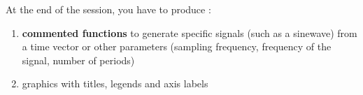 \documentclass[10pt]{article} %
\begin{document}
\begin{minipage}[t]{.60\linewidth}
\begin{mdframed}[style=intextbox,frametitle={}] %


\hypertarget{deliverables}{} %

At the end of the session, you have to produce :
\begin{enumerate}
\item \textbf{commented functions} to generate specific signals (such as a sinewave) from a time vector or other parameters (sampling frequency, frequency of the signal, number of periods)
\item graphics with titles, legends and axis labels
\end{enumerate}

\end{mdframed}



\end{minipage} %

\end{document}
